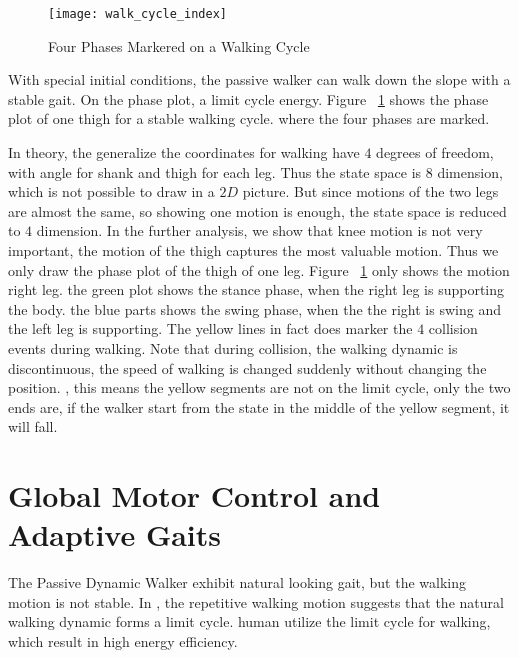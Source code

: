 \begin{figure}[!htbp]
  \begin{center}
    \texttt{[image: walk\_cycle\_index]}
    \caption{Four Phases Markered on a Walking Cycle}
    \label{fig:phasesmaker}
\end{center}
\end{figure}
With special initial conditions, the passive walker can walk down the slope with a stable gait.
On the phase plot,  a limit cycle energy. 
Figure ~\ref{fig:phasesmaker} shows the phase plot of one thigh for a stable walking cycle.
where the four phases are marked. 

In theory, the generalize the coordinates for walking have $4$ degrees of freedom, with angle for shank and thigh for each leg.
Thus the state space is $8$ dimension, which is not possible to draw in a $2D$ picture.
But since motions of the two legs are almost the same, so showing one motion is enough, the state space is reduced to $4$ dimension.
In the further analysis, we show that knee motion is not very important, the motion of the thigh captures the most valuable motion.
Thus we only draw the phase plot of the thigh of one leg.
Figure ~\ref{fig:phasesmaker} only shows the motion right leg.
the green plot shows the stance phase, when the right leg is supporting the body.
the blue parts shows the swing phase, when the the right is swing and the left leg is supporting.
The yellow lines in fact does marker the $4$ collision events during walking.
Note that during collision, the walking dynamic is discontinuous, the speed of walking is changed suddenly without changing the position.
\moit, this means the yellow segments are not on the limit cycle, only the two ends are, if the walker start from the state in the middle of the yellow segment, it will fall.











\section{Global Motor Control and Adaptive Gaits}
The Passive Dynamic Walker exhibit natural looking gait, but the walking motion is not stable.
In \moit, the repetitive walking motion suggests that the natural walking dynamic forms a limit cycle.
human utilize the limit cycle for walking, which result in high energy efficiency.

